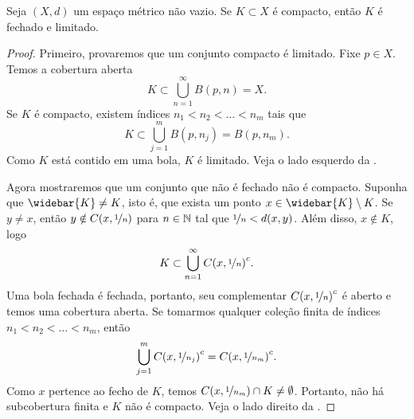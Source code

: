\begin{prop}
Seja $(X,d)$ um espaço métrico não vazio. Se $K \subset X$ é compacto, então
$K$ é fechado e limitado.
\end{prop}

\begin{proof}
Primeiro, provaremos que um conjunto compacto é limitado.
Fixe $p \in X$. Temos a cobertura aberta
\begin{equation*}
K \subset \bigcup_{n=1}^\infty B(p,n) = X .
\end{equation*}
Se $K$ é compacto, existem índices
$n_1 < n_2 < \ldots < n_m$ tais que
\begin{equation*}
K \subset \bigcup_{j=1}^m B(p,n_j) = B(p,n_m) .
\end{equation*}
Como $K$ está contido em uma bola, $K$ é limitado.
Veja o lado esquerdo da .

Agora mostraremos que um conjunto que não é fechado não é compacto. Suponha
que $\widebar{K} \neq K$, isto é, que exista um ponto $x \in \widebar{K}
\setminus K$.
Se $y \neq x$, então
$y \notin C(x,\nicefrac{1}{n})$
para $n \in {\mathbb{N}}$
tal que $\nicefrac{1}{n} < d(x,y)$.
Além disso, $x \notin K$, logo
\begin{equation*}
K \subset \bigcup_{n=1}^\infty {C(x,\nicefrac{1}{n})}^c .
\end{equation*}
Uma bola fechada é fechada, portanto, seu complementar ${C(x,\nicefrac{1}{n})}^c$
é aberto e temos uma cobertura aberta.
Se tomarmos qualquer
coleção finita de índices $n_1 < n_2 < \ldots < n_m$, então
\begin{equation*}
\bigcup_{j=1}^m {C(x,\nicefrac{1}{n_j})}^c 
=
{C(x,\nicefrac{1}{n_m})}^c .
\end{equation*}
Como $x$ pertence ao fecho de $K$,
temos
$C(x,\nicefrac{1}{n_m}) \cap K \neq \emptyset$. Portanto, não há
subcobertura finita e $K$ não é compacto.
Veja o lado direito da .
\end{proof}

